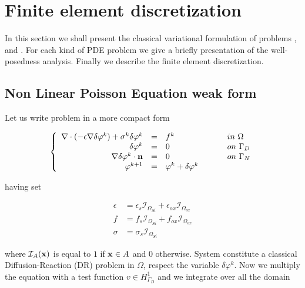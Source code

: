 \chapter{Finite element discretization}

In this section we shall present the classical variational formulation of problems ,  and . For each kind of PDE problem we give a briefly presentation of the well-posedness analysis. Finally we describe the finite element discretization. 


\section{Non Linear Poisson Equation weak form}

Let us write problem  in a more compact form

\begin{equation}
\label{sys: NLP general problem linearized}
\left\{
\begin{array}{rcll}
\nabla \cdot (-\epsilon \nabla \delta \varphi^k) + \sigma^k \delta \varphi^k & = &  f^k & \psp{15} in \psp{2} \Omega \\
\delta \varphi^k & = & 0 & \psp{15} on \psp{2} \Gamma_D \\
\nabla \delta \varphi ^k\cdot \vect{n} & = & 0 & \psp{15} on \psp{2} \Gamma_N
\\
\varphi^{k+1} & = & \varphi^k + \delta \varphi^k
\end{array}
\right.
\end{equation}

having set

\begin{align*}
\epsilon & = \epsilon_s \mathcal{I}_{\Omega_{Si}} + \epsilon_{ox} \mathcal{I}_{\Omega_{ox}} \\
f & = f_s \mathcal{I}_{\Omega_{Si}} + f_{ox} \mathcal{I}_{\Omega_{ox}} \\
\sigma & = \sigma_s \mathcal{I}_{\Omega_{Si}}
\end{align*}

where $\mathcal{I}_A(\mathbf{x})$ is equal to $1$ if $\mathbf{x}\in A$ and $0$ otherwise.
System  constitute a classical Diffusion-Reaction (DR) problem in $\Omega$, respect the variable $\delta \varphi^k$. 
Now we multiply the equation with a test function $v \in H^1_{\Gamma_D}$ and we integrate over all the domain

